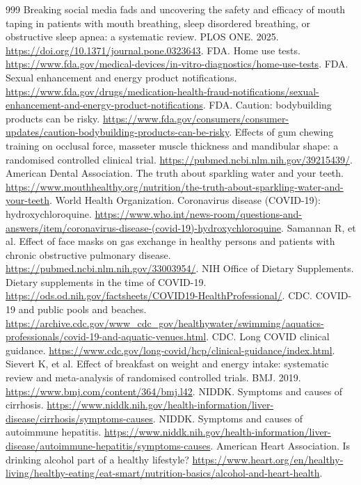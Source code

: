 \documentclass[11pt,oneside]{book}
\begin{document}
\begin{thebibliography}{999}
Breaking social media fads and uncovering the safety and efficacy of mouth taping in patients with mouth breathing, sleep disordered breathing, or obstructive sleep apnea: a systematic review. PLOS ONE. 2025. \url{https://doi.org/10.1371/journal.pone.0323643}.
FDA. Home use tests. \url{https://www.fda.gov/medical-devices/in-vitro-diagnostics/home-use-tests}.
FDA. Sexual enhancement and energy product notifications. \url{https://www.fda.gov/drugs/medication-health-fraud-notifications/sexual-enhancement-and-energy-product-notifications}.
FDA. Caution: bodybuilding products can be risky. \url{https://www.fda.gov/consumers/consumer-updates/caution-bodybuilding-products-can-be-risky}.
Effects of gum chewing training on occlusal force, masseter muscle thickness and mandibular shape: a randomised controlled clinical trial. \url{https://pubmed.ncbi.nlm.nih.gov/39215439/}.
American Dental Association. The truth about sparkling water and your teeth. \url{https://www.mouthhealthy.org/nutrition/the-truth-about-sparkling-water-and-your-teeth}.
World Health Organization. Coronavirus disease (COVID-19): hydroxychloroquine. \url{https://www.who.int/news-room/questions-and-answers/item/coronavirus-disease-(covid-19)-hydroxychloroquine}.
Samannan R, et al. Effect of face masks on gas exchange in healthy persons and patients with chronic obstructive pulmonary disease. \url{https://pubmed.ncbi.nlm.nih.gov/33003954/}.
NIH Office of Dietary Supplements. Dietary supplements in the time of COVID-19. \url{https://ods.od.nih.gov/factsheets/COVID19-HealthProfessional/}.
CDC. COVID-19 and public pools and beaches. \url{https://archive.cdc.gov/www_cdc_gov/healthywater/swimming/aquatics-professionals/covid-19-and-aquatic-venues.html}.
CDC. Long COVID clinical guidance. \url{https://www.cdc.gov/long-covid/hcp/clinical-guidance/index.html}.
Sievert K, et al. Effect of breakfast on weight and energy intake: systematic review and meta-analysis of randomised controlled trials. BMJ. 2019. \url{https://www.bmj.com/content/364/bmj.l42}.
NIDDK. Symptoms and causes of cirrhosis. \url{https://www.niddk.nih.gov/health-information/liver-disease/cirrhosis/symptoms-causes}.
NIDDK. Symptoms and causes of autoimmune hepatitis. \url{https://www.niddk.nih.gov/health-information/liver-disease/autoimmune-hepatitis/symptoms-causes}.
American Heart Association. Is drinking alcohol part of a healthy lifestyle? \url{https://www.heart.org/en/healthy-living/healthy-eating/eat-smart/nutrition-basics/alcohol-and-heart-health}.

\end{thebibliography}
\end{document}
